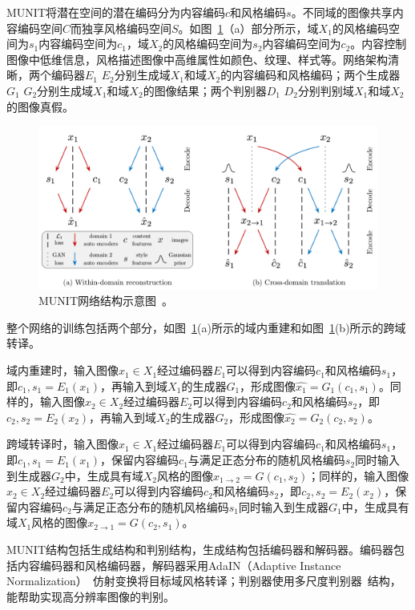 MUNIT将潜在空间的潜在编码分为内容编码$c$和风格编码$s$。不同域的图像共享内容编码空间$C$而独享风格编码空间$S$。如图~\ref{fig:munit}（a）部分所示，域$X_1$的风格编码空间为$s_1$内容编码空间为$c_1$，域$X_2$的风格编码空间为$s_2$内容编码空间为$c_2$。内容控制图像中低维信息，风格描述图像中高维属性如颜色、纹理、样式等。网络架构清晰，两个编码器$E_1$ $E_2$分别生成域$X_1$和域$X_2$的内容编码和风格编码；两个生成器$G_1$ $G_2$分别生成域$X_1$和域$X_2$的图像结果；两个判别器$D_1$ $D_2$分别判别域$X_1$和域$X_2$的图像真假。

\begin{figure}[ht]
    \centering
	\includegraphics[width=\textwidth]{figs/munit.pdf}
	\caption{MUNIT网络结构示意图~\cite{huang2018multimodal}。}
	\label{fig:munit}
\end{figure}

整个网络的训练包括两个部分，如图~\ref{fig:munit}(a)所示的域内重建和如图~\ref{fig:munit}(b)所示的跨域转译。

域内重建时，输入图像$x_1 \in X_1$经过编码器$E_1$可以得到内容编码$c_1$和风格编码$s_1$，即$c_1,s_1=E_1(x_1)$，再输入到域$X_1$的生成器$G_1$，形成图像$\hat{x_1}=G_1(c_1,s_1)$。同样的，输入图像$x_2 \in X_2$经过编码器$E_2$可以得到内容编码$c_2$和风格编码$s_2$，即$c_2,s_2=E_2(x_2)$，再输入到域$X_2$的生成器$G_2$，形成图像$\hat{x_2}=G_2(c_2,s_2)$。

跨域转译时，输入图像$x_1 \in X_1$经过编码器$E_1$可以得到内容编码$c_1$和风格编码$s_1$，即$c_1,s_1=E_1(x_1)$，保留内容编码$c_1$与满足正态分布的随机风格编码$s_2$同时输入到生成器$G_2$中，生成具有域$X_2$风格的图像$x_{1 \rightarrow 2}=G(c_1,s_2)$；同样的，输入图像$x_2 \in X_2$经过编码器$E_2$可以得到内容编码$c_2$和风格编码$s_2$，即$c_2,s_2=E_2(x_2)$，保留内容编码$c_2$与满足正态分布的随机风格编码$s_1$同时输入到生成器$G_1$中，生成具有域$X_1$风格的图像$x_{2 \rightarrow 1}=G(c_2,s_1)$。

MUNIT结构包括生成结构和判别结构，生成结构包括编码器和解码器。编码器包括内容编码器和风格编码器，解码器采用AdaIN（Adaptive Instance Normalization）~\cite{huang2017arbitrary}仿射变换将目标域风格转译；判别器使用多尺度判别器~\cite{wang2018high}结构，能帮助实现高分辨率图像的判别。

